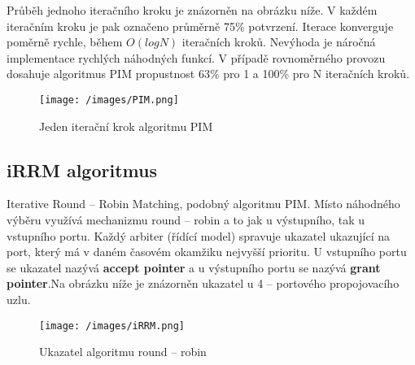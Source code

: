 Průběh jednoho iteračního kroku je znázorněn na obrázku níže. V každém iteračním kroku je pak označeno průměrně 75\% potvrzení. Iterace konverguje poměrně rychle, během $O(logN)$ iteračních kroků. Nevýhoda je náročná implementace rychlých náhodných funkcí. V případě rovnoměrného provozu dosahuje algoritmus PIM propustnost 63\% pro 1 a 100\% pro N iteračních kroků.
\begin{figure}[ht]
\centering
  \begin{center}
    \texttt{[image: /images/PIM.png]}
  \end{center}
  \caption[Jeden iterační krok algoritmu PIM)]{Jeden iterační krok algoritmu PIM}
\end{figure}
\subsection{iRRM algoritmus}
Iterative Round -- Robin Matching, podobný algoritmu PIM. Místo náhodného výběru využívá mechanizmu round -- robin a to jak u výstupního, tak u vstupního portu. Každý arbiter (řídící model) spravuje ukazatel ukazující na port, který má v daném časovém okamžiku nejvyšší prioritu. U vstupního portu se ukazatel nazývá \textbf{accept pointer} a u výstupního portu se nazývá \textbf{grant pointer}.Na obrázku níže je znázorněn ukazatel u 4 -- portového propojovacího uzlu.
\begin{figure}[ht]
\centering
  \begin{center}
    \texttt{[image: /images/iRRM.png]}
  \end{center}
  \caption[Ukazatel algoritmu round -- robin]{Ukazatel algoritmu round -- robin}
\end{figure}
